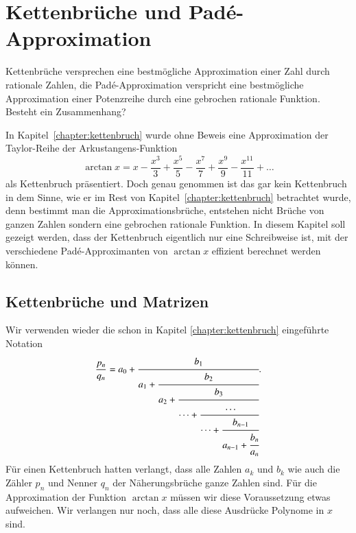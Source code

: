 %
%
%
\chapter{Kettenbrüche und Padé-Approximation\label{chapter:arctan}}
\rhead{}
\begin{refsection}
%

{\parindent0pt
Kettenbrüche} versprechen eine bestmögliche Approximation einer Zahl durch
rationale Zahlen, die Padé-Approximation verspricht eine bestmögliche
Approximation einer Potenzreihe durch eine gebrochen rationale Funktion.
Besteht ein Zusammenhang?

In Kapitel~\ref{chapter:kettenbruch} wurde ohne Beweis eine Approximation der 
Taylor-Reihe der Arkustangens-Funktion
\begin{equation}
\arctan x
=
x-\frac{x^3}{3}+\frac{x^5}{5}-\frac{x^7}{7}+\frac{x^9}{9}-\frac{x^{11}}{11}
+\dots
\label{arctan:arctan}
\end{equation}
als Kettenbruch präsentiert.
Doch genau genommen ist das gar kein Kettenbruch in dem Sinne, wie er
im Rest von Kapitel~\ref{chapter:kettenbruch} betrachtet wurde, denn
bestimmt man die Approximationsbrüche, entstehen nicht Brüche von ganzen
Zahlen sondern eine gebrochen rationale Funktion.
In diesem Kapitel soll gezeigt werden, dass der Kettenbruch eigentlich
nur eine Schreibweise ist, mit der verschiedene Padé-Approximanten von
$\arctan x$ effizient berechnet werden können.

\section{Kettenbrüche und Matrizen
\label{arctan:section:matrizen}}
Wir verwenden wieder die schon in Kapitel \ref{chapter:kettenbruch}
eingeführte Notation
\[
\frac{p_n}{q_n}
=
a_0 +
\cfrac{b_1}{
a_1+\cfrac{b_2}{
a_2+\cfrac{b_3}{
\dots+\cfrac{\dots}{\dots+\cfrac{b_{n-1}}{a_{n-1}+\cfrac{b_n}{a_n}}}}}}.
\]
Für einen Kettenbruch hatten verlangt, dass alle Zahlen $a_k$ und $b_k$ 
wie auch die Zähler $p_n$ und Nenner $q_n$ der Näherungsbrüche
ganze Zahlen sind.
Für die Approximation der Funktion $\arctan x$ müssen wir
diese Voraussetzung etwas aufweichen.
Wir verlangen nur noch, dass alle diese Ausdrücke Polynome in $x$ sind.


\end{refsection}
